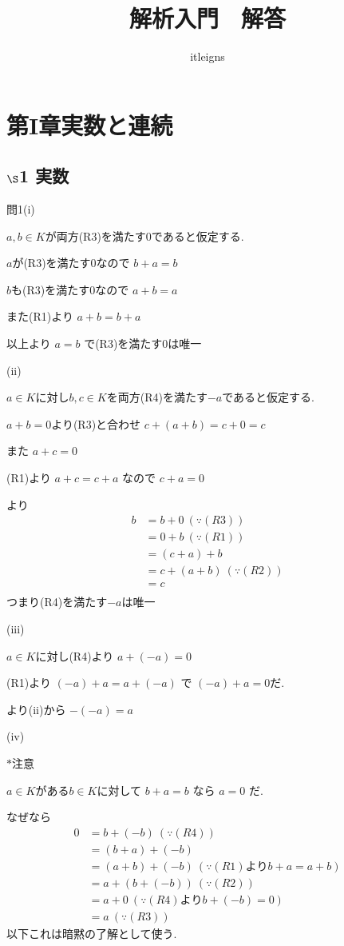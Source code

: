 \documentclass{jsarticle}
\title{解析入門　解答}
\author{itleigns}
\begin{document}
\maketitle{}
\section*{第I章実数と連続}
\subsection*{$\S$1 実数}
問1(i)

$a,b\in K$が両方(R3)を満たす0であると仮定する.

$a$が(R3)を満たす$0$なので
$b+a=b$

$b$も(R3)を満たす$0$なので
$a+b=a$

また(R1)より
$a+b=b+a$


以上より
$a=b$
で(R3)を満たす0は唯一


(ii)

$a\in K$に対し$b,c\in K$を両方(R4)を満たす$-a$であると仮定する.

$a+b = 0$より(R3)と合わせ
$c+(a+b)=c+0=c$

また
$a+c=0$


(R1)より
$a+c=c+a$
なので
$c+a=0$


より
\begin{align*}
b &= b+0 \ (\because (R3))\\
&= 0+b \ (\because (R1))\\
&= (c+a)+b\\
&= c+(a+b) \ (\because (R2))\\
&= c \\
\end{align*}
つまり(R4)を満たす$-a$は唯一


(iii)

$a\in K$に対し(R4)より
$a+(-a)=0$


(R1)より
$(-a)+a=a+(-a)$
で
$(-a)+a=0$だ.

より(ii)から
$-(-a)=a$

(iv)

$\ast$注意

$a\in K$がある$b\in K$に対して
$b+a=b$
なら
$a=0$
だ.

なぜなら
\begin{align*}
0 &= b+(-b) \ (\because (R4))\\
&= (b+a)+(-b)\\
&= (a+b)+(-b) \ (\because (R1) より b+a=a+b)\\
&= a+(b+(-b)) \ (\because (R2))\\
&= a+0 \ (\because (R4) より b+(-b)=0)\\
&= a \ (\because (R3))
\end{align*}
以下これは暗黙の了解として使う.
\end{document}

